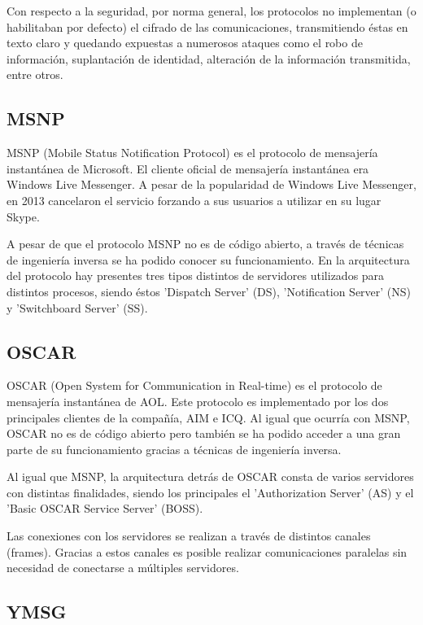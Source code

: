 Con respecto a la seguridad, por norma general, los protocolos no implementan (o habilitaban por defecto) el cifrado de las comunicaciones, transmitiendo éstas en texto claro y quedando expuestas a numerosos ataques como el robo de información, suplantación de identidad, alteración de la información transmitida, entre otros.

\subsection{MSNP}

MSNP (Mobile Status Notification Protocol) es el protocolo de mensajería instantánea de Microsoft. El cliente oficial de mensajería instantánea era Windows Live Messenger. A pesar de la popularidad de Windows Live Messenger, en 2013 cancelaron el servicio forzando a sus usuarios a utilizar en su lugar Skype.

A pesar de que el protocolo MSNP no es de código abierto, a través de técnicas de ingeniería inversa se ha podido conocer su funcionamiento. En la arquitectura del protocolo hay presentes tres tipos distintos de servidores utilizados para distintos procesos, siendo éstos 'Dispatch Server' (DS), 'Notification Server' (NS) y 'Switchboard Server' (SS).

\subsection{OSCAR}

OSCAR (Open System for Communication in Real-time) es el protocolo de mensajería instantánea de AOL. Este protocolo es implementado por los dos principales clientes de la compañía, AIM e ICQ. Al igual que ocurría con MSNP, OSCAR no es de código abierto pero también se ha podido acceder a una gran parte de su funcionamiento gracias a técnicas de ingeniería inversa.

Al igual que MSNP, la arquitectura detrás de OSCAR consta de varios servidores con distintas finalidades, siendo los principales el 'Authorization Server' (AS) y el 'Basic OSCAR Service Server' (BOSS).

Las conexiones con los servidores se realizan a través de distintos canales (frames). Gracias a estos canales es posible realizar comunicaciones paralelas sin necesidad de conectarse a múltiples servidores.

\subsection{YMSG}

